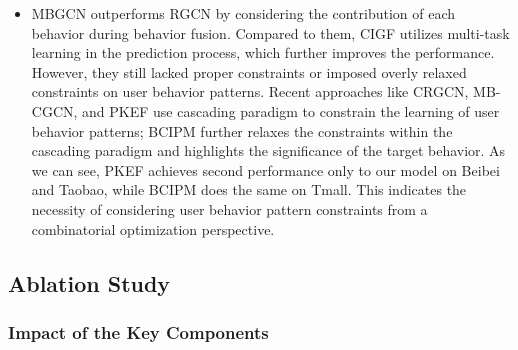 \begin{itemize}
\item MBGCN outperforms RGCN by considering the contribution of each behavior during behavior fusion. Compared to them, CIGF utilizes multi-task learning in the prediction process, which further improves the performance. However, they still lacked
proper constraints or imposed overly relaxed constraints on user behavior patterns. Recent approaches like CRGCN, MB-CGCN, and PKEF use cascading paradigm to constrain the learning of user behavior patterns; BCIPM further relaxes the constraints within the cascading paradigm and highlights the significance of the target behavior. As we can see, PKEF achieves second performance only to our model on Beibei and Taobao, while BCIPM does the same on Tmall. This indicates the necessity of considering user behavior pattern constraints from a combinatorial optimization perspective.
\end{itemize}

\subsection{Ablation Study}
\label{ablation_study}
\subsubsection{Impact of the Key Components}

